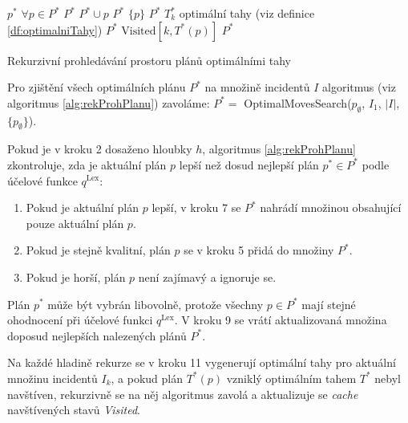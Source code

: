 \begin{algorithm}[H]
  \begin{algorithmic}[1]
      \State $p^*$ \gets $\forall p \in P^*$
        \State $P^*$ \gets $ P^* \cup p$
        \State $P^*$ \gets $\{ p \}$
      \EndIf
      \State \Return $P^*$
    \EndIf
    \State $T^*_k$ \gets optimální tahy (viz definice \ref{df:optimalniTahy})
        \State $P^*$ \gets {}
        \State $\text{Visited}[k, T^*(p)]$ \gets {}
      \EndIf
    \EndFor
    \State \Return $P^*$
  \EndFunction
  \end{algorithmic}
  \caption{Rekurzivní prohledávání prostoru plánů optimálními tahy}
  \label{alg:rekProhPlanu}
\end{algorithm}

Pro zjištění všech optimálních plánu $P^*$ na množině incidentů $I$ algoritmus (viz algoritmus \ref{alg:rekProhPlanu}) zavoláme: $P^* = $ OptimalMovesSearch($p_{\emptyset}$, $I_1$, $|I|$, $\{ p_{\emptyset} \}$).

Pokud je v kroku 2 dosaženo hloubky $h$, algoritmus \ref{alg:rekProhPlanu} zkontroluje, zda je aktuální plán $p$ lepší než dosud nejlepší plán $p^* \in P^*$ podle účelové funkce $q^{\text{Lex}}$:
\begin{enumerate}
  \item Pokud je aktuální plán $p$ lepší, v kroku 7 se $P^*$ nahrádí množinou obsahující pouze aktuální plán $p$. 
  \item Pokud je stejně kvalitní, plán $p$ se v kroku 5 přidá do množiny $P^*$.
  \item Pokud je horší, plán $p$ není zajímavý a ignoruje se.
\end{enumerate}
Plán $p^*$ může být vybrán libovolně, protože všechny $p \in P^*$ mají stejné ohodnocení při účelové funkci $q^{\text{Lex}}$.
V kroku 9 se vrátí aktualizovaná množina doposud nejlepších nalezených plánů $P^*$.

Na každé hladině rekurze se v kroku 11 vygenerují optimální tahy pro aktuální množinu incidentů $I_k$, a pokud plán $T^*(p)$ vzniklý optimálním tahem $T^*$ nebyl navštíven,
rekurzivně se na něj algoritmus zavolá a aktualizuje se \textit{cache} navštívených stavů \textit{Visited}.

